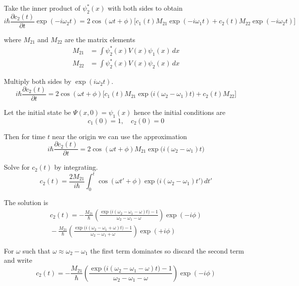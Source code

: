 Take the inner product of $\psi_2^*(x)$ with both sides to obtain
\begin{equation*}
i\hbar\frac{\partial c_2(t)}{\partial t}\exp(-i\omega_2t)
=2\cos(\omega t+\phi)
\biggl[
c_1(t)M_{21}\exp(-i\omega_1t)+
c_2(t)M_{22}\exp(-i\omega_2t)
\biggr]
\end{equation*}

where $M_{21}$ and $M_{22}$ are the matrix elements
\begin{align*}
M_{21}&=\int\psi_2^*(x)V(x)\psi_1(x)\,dx
\\
M_{22}&=\int\psi_2^*(x)V(x)\psi_2(x)\,dx
\end{align*}

Multiply both sides by $\exp(i\omega_2t)$.
\begin{equation*}
i\hbar\frac{\partial c_2(t)}{\partial t}
=2\cos(\omega t+\phi)
\biggl[
c_1(t)M_{21}\exp\bigl(i(\omega_2-\omega_1)t\bigr)+c_2(t)M_{22}
\biggr]
\end{equation*}

Let the initial state be $\Psi(x,0)=\psi_1(x)$ hence the initial conditions are
\begin{equation*}
c_1(0)=1,\quad c_2(0)=0
\end{equation*}

Then for time $t$ near the origin we can use the approximation
\begin{equation*}
i\hbar\frac{\partial c_2(t)}{\partial t}
=2\cos(\omega t+\phi)M_{21}\exp\bigl(i(\omega_2-\omega_1)t\bigr)
\end{equation*}

Solve for $c_2(t)$ by integrating.
\begin{equation*}
c_2(t)=\frac{2M_{21}}{i\hbar}
\int_0^t\cos(\omega t'+\phi)\exp\bigl(i(\omega_2-\omega_1)t'\bigr)\,dt'
\end{equation*}

The solution is
\begin{multline*}
c_2(t)
=-\frac{M_{21}}{\hbar}
\left(
\frac{\exp\bigl(i(\omega_2-\omega_1-\omega) t\bigr)-1}{\omega_2-\omega_1-\omega}
\right)\exp(-i\phi)
\\{}-\frac{M_{21}}{\hbar}
\left(
\frac{\exp\bigl(i(\omega_2-\omega_1+\omega) t\bigr)-1}{\omega_2-\omega_1+\omega}
\right)\exp(+i\phi)
\tag{1}
\end{multline*}

For $\omega$ such that $\omega\approx\omega_2-\omega_1$ the first term
dominates so discard the second term and write
\begin{equation*}
c_2(t)=-\frac{M_{21}}{\hbar}
\left(
\frac{\exp\bigl(i(\omega_2-\omega_1-\omega) t\bigr)-1}{\omega_2-\omega_1-\omega}
\right)\exp(-i\phi)
\end{equation*}

